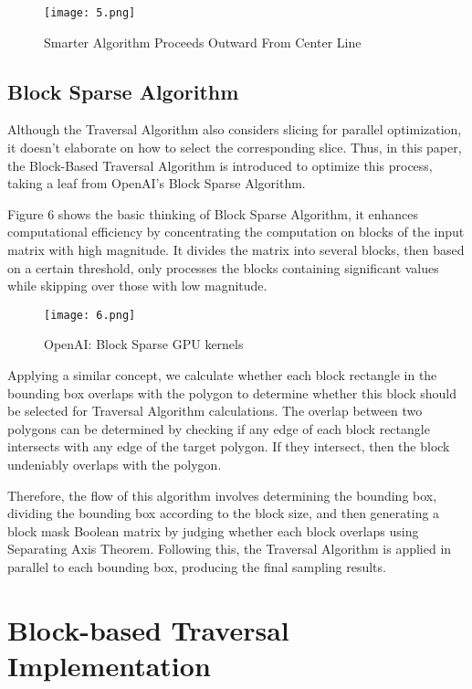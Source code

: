 \documentclass[
	a4paper, %
	10pt, %
	unnumberedsections, %
	twoside, %
]{LTJournalArticle}
\begin{document}
\begin{figure}[H] %
	\texttt{[image: 5.png]}
	\caption{Smarter Algorithm Proceeds Outward From Center Line}
\end{figure}

\subsection{Block Sparse Algorithm}
Although the Traversal Algorithm also considers slicing for parallel optimization, it doesn't elaborate on how to select the corresponding slice. Thus, in this paper, the Block-Based Traversal Algorithm is introduced to optimize this process, taking a leaf from OpenAI's Block Sparse Algorithm.

Figure 6 shows the basic thinking of Block Sparse Algorithm, it enhances computational efficiency by concentrating the computation on blocks of the input matrix with high magnitude. It divides the matrix into several blocks, then based on a certain threshold, only processes the blocks containing significant values while skipping over those with low magnitude.\cite{gray2017}

\begin{figure}[H] %
	\texttt{[image: 6.png]}
	\caption{OpenAI: Block Sparse GPU kernels}
\end{figure}

Applying a similar concept, we calculate whether each block rectangle in the bounding box overlaps with the polygon to determine whether this block should be selected for Traversal Algorithm calculations. The overlap between two polygons can be determined by checking if any edge of each block rectangle intersects with any edge of the target polygon. If they intersect, then the block undeniably overlaps with the polygon.

Therefore, the flow of this algorithm involves determining the bounding box, dividing the bounding box according to the block size, and then generating a block mask Boolean matrix by judging whether each block overlaps using Separating Axis Theorem.\cite{gottschalk1996} Following this, the Traversal Algorithm is applied in parallel to each bounding box, producing the final sampling results.

\section{Block-based Traversal Implementation}
\end{document}
